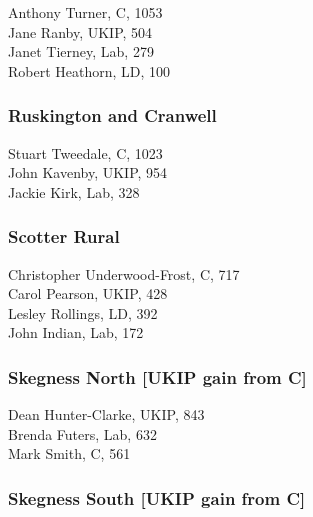 \documentclass[a4paper,openany,10pt]{book}
\begin{document}


Anthony Turner, C, 1053\\
Jane Ranby, UKIP, 504\\
Janet Tierney, Lab, 279\\
Robert Heathorn, LD, 100\\


\subsubsection*{Ruskington and Cranwell}



Stuart Tweedale, C, 1023\\
John Kavenby, UKIP, 954\\
Jackie Kirk, Lab, 328\\


\subsubsection*{Scotter Rural}



{Christopher Underwood-Frost}, C, 717\\
Carol Pearson, UKIP, 428\\
Lesley Rollings, LD, 392\\
John Indian, Lab, 172\\


\subsubsection*{Skegness North \hspace*{\fill}\nolinebreak[1]%
\enspace\hspace*{\fill}
[UKIP gain from C]}



Dean Hunter-Clarke, UKIP, 843\\
Brenda Futers, Lab, 632\\
Mark Smith, C, 561\\


\subsubsection*{Skegness South \hspace*{\fill}\nolinebreak[1]%
\enspace\hspace*{\fill}
[UKIP gain from C]}
\end{document}
